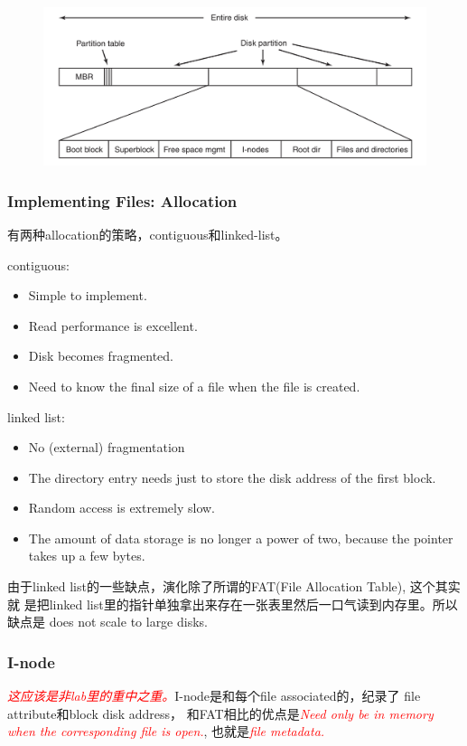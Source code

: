 \documentclass[a4paper]{article}
\newcommand{\emphasis}[1]{\textcolor{red}{\textit{#1}}}
\begin{document}
\begin{figure}
  \centering
  \includegraphics{disklayout.png}
  \caption{}
  \label{fig:disklayout}
\end{figure}

\subsubsection{Implementing Files: Allocation}
有两种allocation的策略，contiguous和linked-list。

contiguous:
\begin{itemize}
\item{Simple to implement.} 
\item{Read performance is excellent.} 
\item{Disk becomes fragmented.} 
\item{Need to know the final size of a file when
the file is created.} 
\end{itemize}

linked list:
\begin{itemize}
\item{No (external) fragmentation} 
\item{The directory entry needs just to store
the disk address of the first block.} 
\item{Random access is extremely slow.} 
\item{The amount of data storage is no longer
a power of two, because the pointer
takes up a few bytes.} 
\end{itemize}

由于linked list的一些缺点，演化除了所谓的FAT(File Allocation Table), 这个其实就
是把linked list里的指针单独拿出来存在一张表里然后一口气读到内存里。所以缺点是
does not scale to large disks.

\subsubsection{I-node}
\emphasis{这应该是非lab里的重中之重。}I-node是和每个file associated的，纪录了
file attribute和block disk address， 和FAT相比的优点是\emphasis{Need only be in
  memory when the corresponding file is open.}, 也就是\emphasis{file metadata.}
\end{document}
